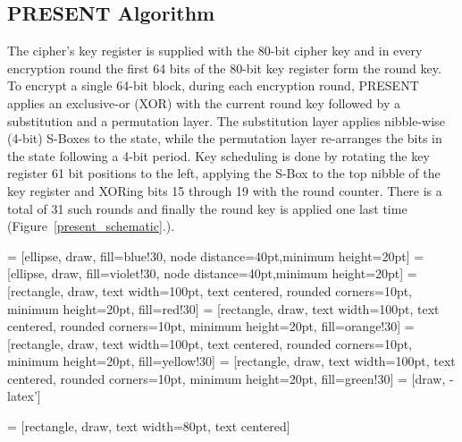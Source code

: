 \documentclass[11pt]{llncs2e} %
\begin{document}
\subsection{PRESENT Algorithm}
The cipher's key register is supplied with the 80-bit cipher key and in every encryption round the first 64 bits of the 80-bit key register form the round key.
To encrypt a single 64-bit block, during each encryption round, PRESENT applies an exclusive-or (XOR) with the current round key followed by a substitution and a permutation layer.
The substitution layer applies nibble-wise (4-bit) S-Boxes to the state, while the permutation layer re-arranges the bits in the state following a 4-bit period.
Key scheduling is done by rotating the key register 61 bit positions to the left, applying the S-Box to the top nibble of the key register and XORing bits 15 through 19 with the round counter.
There is a total of 31 such rounds and finally the round key is applied one last time 
(Figure~\ref{present_schematic}.).

 = [ellipse, draw, fill=blue!30, node distance=40pt,minimum height=20pt]
 = [ellipse, draw, fill=violet!30, node distance=40pt,minimum height=20pt]
 = [rectangle, draw, text width=100pt, text centered, rounded corners=10pt, minimum height=20pt, fill=red!30]
 = [rectangle, draw, text width=100pt, text centered, rounded corners=10pt, minimum height=20pt, fill=orange!30]
 = [rectangle, draw, text width=100pt, text centered, rounded corners=10pt, minimum height=20pt, fill=yellow!30]
 = [rectangle, draw, text width=100pt, text centered, rounded corners=10pt, minimum height=20pt, fill=green!30]
 = [draw, -latex']

 = [rectangle, draw, text width=80pt, text centered]
\end{document}
